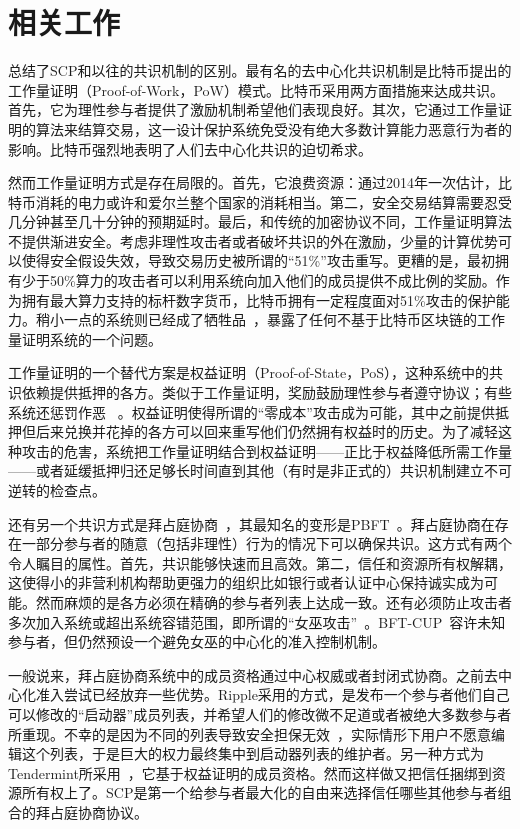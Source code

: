 \section{相关工作}

总结了SCP和以往的共识机制的区别。最有名的去中心化共识机制是比特币提出的工作量证明（Proof-of-Work，PoW）模式。比特币采用两方面措施来达成共识。首先，它为理性参与者提供了激励机制希望他们表现良好。其次，它通过工作量证明的算法来结算交易，这一设计保护系统免受没有绝大多数计算能力恶意行为者的影响。比特币强烈地表明了人们去中心化共识的迫切希求。

然而工作量证明方式是存在局限的。首先，它浪费资源：通过2014年一次估计，比特币消耗的电力或许和爱尔兰整个国家的消耗相当。第二，安全交易结算需要忍受几分钟甚至几十分钟的预期延时。最后，和传统的加密协议不同，工作量证明算法不提供渐进安全。考虑非理性攻击者或者破坏共识的外在激励，少量的计算优势可以使得安全假设失效，导致交易历史被所谓的``51\%''攻击重写。更糟的是，最初拥有少于50\%算力的攻击者可以利用系统向加入他们的成员提供不成比例的奖励。作为拥有最大算力支持的标杆数字货币，比特币拥有一定程度面对51\%攻击的保护能力。稍小一点的系统则已经成了牺牲品~\cite{attack_bbt2013,attack_cb2013}，暴露了任何不基于比特币区块链的工作量证明系统的一个问题。

工作量证明的一个替代方案是权益证明（Proof-of-State，PoS），这种系统中的共识依赖提供抵押的各方。类似于工作量证明，奖励鼓励理性参与者遵守协议；有些系统还惩罚作恶~\cite{slasher2014, neucoin2015} 。权益证明使得所谓的``零成本''攻击成为可能，其中之前提供抵押但后来兑换并花掉的各方可以回来重写他们仍然拥有权益时的历史。为了减轻这种攻击的危害，系统把工作量证明结合到权益证明——正比于权益降低所需工作量——或者延缓抵押归还足够长时间直到其他（有时是非正式的）共识机制建立不可逆转的检查点。

还有另一个共识方式是拜占庭协商~\cite{Pease:1980:RAP:322186.322188,Lamport:1982:BGP:357172.357176}，其最知名的变形是PBFT~\cite{Castro:1999:PBFT}。拜占庭协商在存在一部分参与者的随意（包括非理性）行为的情况下可以确保共识。这方式有两个令人瞩目的属性。首先，共识能够快速而且高效。第二，信任和资源所有权解耦，这使得小的非营利机构帮助更强力的组织比如银行或者认证中心保持诚实成为可能。然而麻烦的是各方必须在精确的参与者列表上达成一致。还有必须防止攻击者多次加入系统或超出系统容错范围，即所谓的``女巫攻击''~\cite{Douceur:2002:SA:646334.687813}。BFT-CUP~\cite{Alchieri:2008:BCU:1496310.1496316}容许未知参与者，但仍然预设一个避免女巫的中心化的准入控制机制。

一般说来，拜占庭协商系统中的成员资格通过中心权威或者封闭式协商。之前去中心化准入尝试已经放弃一些优势。Ripple采用的方式，是发布一个参与者他们自己可以修改的``启动器''成员列表，并希望人们的修改微不足道或者被绝大多数参与者所重现。不幸的是因为不同的列表导致安全担保无效~\cite{ripple2014}，实际情形下用户不愿意编辑这个列表，于是巨大的权力最终集中到启动器列表的维护者。另一种方式为Tendermint所采用~\cite{tendermint2014}，它基于权益证明的成员资格。然而这样做又把信任捆绑到资源所有权上了。SCP是第一个给参与者最大化的自由来选择信任哪些其他参与者组合的拜占庭协商协议。